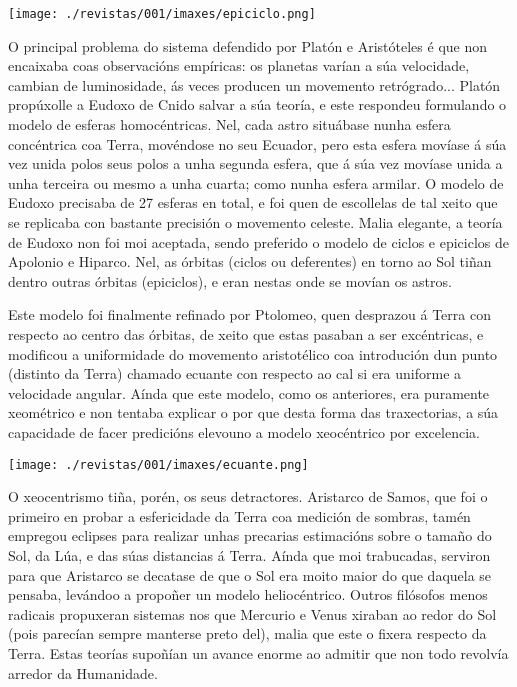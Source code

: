 \begin{refsection}
\begin{multicols}{2}
\begin{center}
    \texttt{[image: ./revistas/001/imaxes/epiciclo.png]}
    \label{fig:epiciclo}
\end{center}

O principal problema do sistema defendido por Platón e Aristóteles é que non
encaixaba coas observacións empíricas: os planetas varían a súa velocidade,
cambian de luminosidade, ás veces producen un movemento retrógrado... Platón
propúxolle a Eudoxo de Cnido salvar a súa teoría, e este respondeu formulando o
modelo de esferas homocéntricas. Nel, cada astro situábase nunha esfera
concéntrica coa Terra, movéndose no seu Ecuador, pero esta esfera movíase á súa
vez unida polos seus polos a unha segunda esfera, que á súa vez movíase unida a
unha terceira ou mesmo a unha cuarta; como nunha esfera armilar. O modelo de
Eudoxo precisaba de 27 esferas en total, e foi quen de escollelas de tal xeito
que se replicaba con bastante precisión o movemento celeste. Malia elegante, a
teoría de Eudoxo non foi moi aceptada, sendo preferido o modelo de ciclos e
epiciclos de Apolonio e Hiparco. Nel, as órbitas (ciclos ou deferentes) en
torno ao Sol tiñan dentro outras órbitas (epiciclos), e eran nestas onde se
movían os astros.


Este modelo foi finalmente refinado por Ptolomeo, quen desprazou á Terra con
respecto ao centro das órbitas, de xeito que estas pasaban a ser excéntricas, e
modificou a uniformidade do movemento aristotélico coa introdución dun punto
(distinto da Terra) chamado ecuante con respecto ao cal si era uniforme a
velocidade angular. Aínda que este modelo, como os anteriores, era puramente
xeométrico e non tentaba explicar o por que desta forma das traxectorias, a súa
capacidade de facer predicións elevouno a modelo xeocéntrico por excelencia.

\begin{center}
    \texttt{[image: ./revistas/001/imaxes/ecuante.png]}
\end{center}

O xeocentrismo tiña, porén, os seus detractores. Aristarco de Samos, que foi o
primeiro en probar a esfericidade da Terra coa medición de sombras, tamén
empregou eclipses para realizar unhas precarias estimacións sobre o tamaño do
Sol, da Lúa, e das súas distancias á Terra. Aínda que moi trabucadas, serviron
para que Aristarco se decatase de que o Sol era moito maior do que daquela se
pensaba, levándoo a propoñer un modelo heliocéntrico. Outros filósofos menos
radicais propuxeran sistemas nos que Mercurio e Venus xiraban ao redor do Sol
(pois parecían sempre manterse preto del), malia que este o fixera respecto da
Terra. Estas teorías supoñían un avance enorme ao admitir que non todo revolvía
arredor da Humanidade.


\end{multicols}
\end{refsection}
